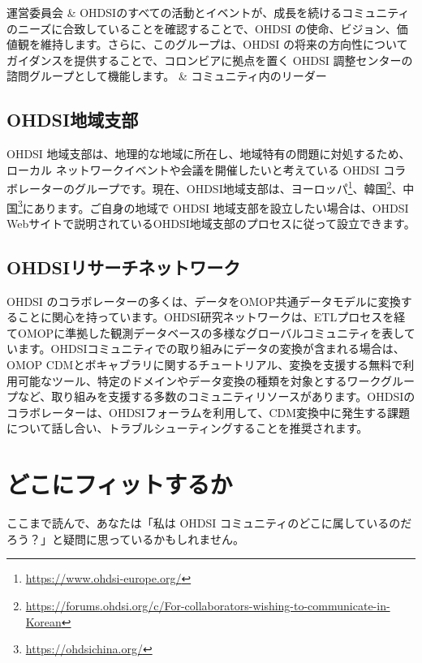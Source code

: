 \documentclass[
  11pt]{book}
\theoremstyle{definition}
\theoremstyle{definition}
\theoremstyle{definition}
\theoremstyle{definition}
\theoremstyle{remark}
\begin{document}
\begin{longtable}[]
運営委員会 & OHDSIのすべての活動とイベントが、成長を続けるコミュニティのニーズに合致していることを確認することで、OHDSI の使命、ビジョン、価値観を維持します。さらに、このグループは、OHDSI の将来の方向性についてガイダンスを提供することで、コロンビアに拠点を置く OHDSI 調整センターの諮問グループとして機能します。 & コミュニティ内のリーダー \\
\end{longtable}

\subsection{OHDSI地域支部}\label{ohdsiux5730ux57dfux652fux90e8}

OHDSI 地域支部は、地理的な地域に所在し、地域特有の問題に対処するため、ローカル ネットワークイベントや会議を開催したいと考えている OHDSI コラボレーターのグループです。現在、OHDSI地域支部は、ヨーロッパ\footnote{\url{https://www.ohdsi-europe.org/}}、韓国\footnote{\url{https://forums.ohdsi.org/c/For-collaborators-wishing-to-communicate-in-Korean}}、中国\footnote{\url{https://ohdsichina.org/}}にあります。ご自身の地域で OHDSI 地域支部を設立したい場合は、OHDSI Webサイトで説明されているOHDSI地域支部のプロセスに従って設立できます。

\subsection{OHDSIリサーチネットワーク}\label{ohdsiux30eaux30b5ux30fcux30c1ux30cdux30c3ux30c8ux30efux30fcux30af}

OHDSI のコラボレーターの多くは、データをOMOP共通データモデルに変換することに関心を持っています。OHDSI研究ネットワークは、ETLプロセスを経てOMOPに準拠した観測データベースの多様なグローバルコミュニティを表しています。OHDSIコミュニティでの取り組みにデータの変換が含まれる場合は、OMOP CDMとボキャブラリに関するチュートリアル、変換を支援する無料で利用可能なツール、特定のドメインやデータ変換の種類を対象とするワークグループなど、取り組みを支援する多数のコミュニティリソースがあります。OHDSIのコラボレーターは、OHDSIフォーラムを利用して、CDM変換中に発生する課題について話し合い、トラブルシューティングすることを推奨されます。

\section{どこにフィットするか}\label{ux3069ux3053ux306bux30d5ux30a3ux30c3ux30c8ux3059ux308bux304b}

ここまで読んで、あなたは「私は OHDSI コミュニティのどこに属しているのだろう？」と疑問に思っているかもしれません。
\end{document}
